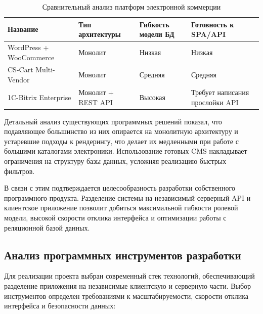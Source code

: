 \begin{table}[H]
	\centering
	\caption{Сравнительный анализ платформ электронной коммерции}
	\label{tab:competitors}
	\begin{tabular}{|p{}|p{}|p{}|p{}|}
		\hline
		\textbf{Название} & \textbf{Тип \linebreak архитектуры} & \textbf{Гибкость \linebreak модели БД} & \textbf{Готовность \linebreak к SPA/API} \\ \hline
		WordPress + \linebreak WooCommerce & Монолит & Низкая & Низкая \\ \hline
		CS-Cart \linebreak Multi-Vendor & Монолит & Средняя & Средняя \\ \hline
		1C-Bitrix \linebreak Enterprise & Монолит + REST API & Высокая & Требует написания \linebreak прослойки API \\ \hline
	\end{tabular}
\end{table}

Детальный анализ существующих программных решений показал, что подавляющее большинство из них опирается на монолитную архитектуру 
и устаревшие подходы к рендерингу, что делает их медленными при работе с большими каталогами электроники. 
Использование готовых CMS накладывает ограничения на структуру базы данных, усложняя реализацию быстрых фильтров.

В связи с этим подтверждается целесообразность разработки собственного программного продукта. Разделение системы на независимый серверный API 
и клиентское приложение позволит добиться максимальной гибкости ролевой модели, высокой скорости отклика интерфейса и 
оптимизации работы с реляционной базой данных.

\subsection{Анализ программных инструментов разработки}

Для реализации проекта выбран современный стек технологий, обеспечивающий разделение приложения на независимые клиентскую и серверную части. Выбор инструментов определен требованиями 
к масштабируемости, скорости отклика интерфейса и безопасности данных:

